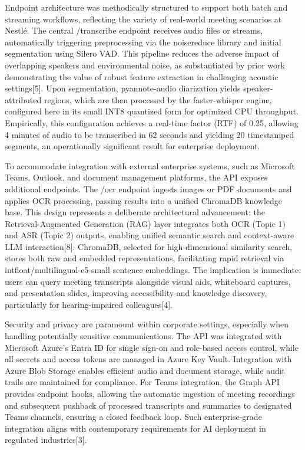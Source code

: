 \documentclass[12pt,a4paper]{article}
\begin{document}
Endpoint architecture was methodically structured to support both batch and streaming workflows, reflecting the variety of real-world meeting scenarios at Nestlé. The central /transcribe endpoint receives audio files or streams, automatically triggering preprocessing via the noisereduce library and initial segmentation using Silero VAD. This pipeline reduces the adverse impact of overlapping speakers and environmental noise, as substantiated by prior work demonstrating the value of robust feature extraction in challenging acoustic settings[5]. Upon segmentation, pyannote-audio diarization yields speaker-attributed regions, which are then processed by the faster-whisper engine, configured here in its small INT8 quantized form for optimized CPU throughput. Empirically, this configuration achieves a real-time factor (RTF) of 0.25, allowing 4 minutes of audio to be transcribed in 62 seconds and yielding 20 timestamped segments, an operationally significant result for enterprise deployment.


To accommodate integration with external enterprise systems, such as Microsoft Teams, Outlook, and document management platforms, the API exposes additional endpoints. The /ocr endpoint ingests images or PDF documents and applies OCR processing, passing results into a unified ChromaDB knowledge base. This design represents a deliberate architectural advancement: the Retrieval-Augmented Generation (RAG) layer integrates both OCR (Topic 1) and ASR (Topic 2) outputs, enabling unified semantic search and context-aware LLM interaction[8]. ChromaDB, selected for high-dimensional similarity search, stores both raw and embedded representations, facilitating rapid retrieval via intfloat/multilingual-e5-small sentence embeddings. The implication is immediate: users can query meeting transcripts alongside visual aids, whiteboard captures, and presentation slides, improving accessibility and knowledge discovery, particularly for hearing-impaired colleagues[4].


Security and privacy are paramount within corporate settings, especially when handling potentially sensitive communications. The API was integrated with Microsoft Azure’s Entra ID for single sign-on and role-based access control, while all secrets and access tokens are managed in Azure Key Vault. Integration with Azure Blob Storage enables efficient audio and document storage, while audit trails are maintained for compliance. For Teams integration, the Graph API provides endpoint hooks, allowing the automatic ingestion of meeting recordings and subsequent pushback of processed transcripts and summaries to designated Teams channels, ensuring a closed feedback loop. Such enterprise-grade integration aligns with contemporary requirements for AI deployment in regulated industries[3].
\end{document}
